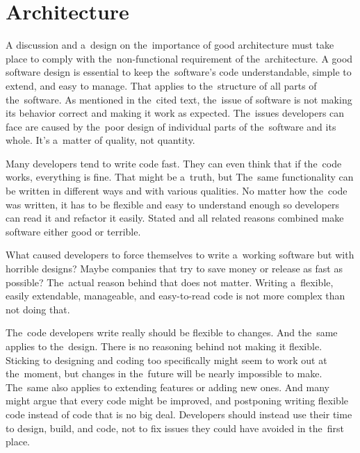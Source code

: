 \section{Architecture}

A discussion and a~design on the~importance of good architecture must take place to comply with the~non-functional requirement of the~architecture.
\linebreak
A good software design is essential to keep the~software's code understandable, simple to extend, and easy to manage.
That applies to the~structure of all parts of the~software.
As mentioned in the~cited text, the~issue of software is not making its behavior correct and making it work as expected.
The~issues developers can face are caused by the~poor design of individual parts of the~software and its whole.
It's a~matter of quality, not quantity.

Many developers tend to write code fast.
They can even think that if the~code works, everything is fine.
That might be a~truth, but 
The~same functionality can be written in different ways and with various qualities.
No matter how the~code was written, it has to be flexible and easy to understand enough so developers can read it and refactor it easily.
Stated and all related reasons combined make software either good or terrible.

What caused developers to force themselves to write a~working software but with horrible designs?
Maybe companies that try to save money or release as fast as possible?
The~actual reason behind that does not matter.
Writing a~flexible, easily extendable, manageable, and easy-to-read code is not more complex than not doing that.

The~code developers write really should be flexible to changes.
And the~same applies to the~design.
There is no reasoning behind not making it flexible.
Sticking to designing and coding too specifically might seem to work out at the~moment, but changes in the~future will be nearly impossible to make.
The~same also applies to extending features or adding new ones.
And many might argue that every code might be improved, and postponing writing flexible code instead of code that  is no big deal.
Developers should instead use their time to design, build, and code, not to fix issues they could have avoided in the~first place.

